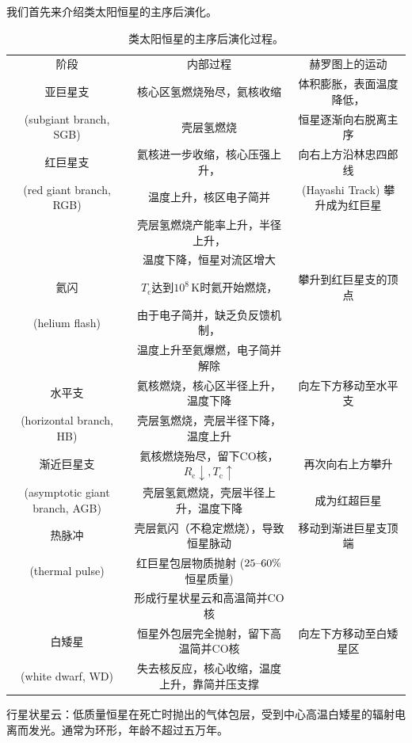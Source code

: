 \documentclass[../天体物理基础.tex]{subfiles}
\begin{document}
我们首先来介绍类太阳恒星的主序后演化。
\begin{table}[!htbp]
\centering
\caption{类太阳恒星的主序后演化过程。}
\begin{tabular}{c c c}
\hline
阶段 & 内部过程 & 赫罗图上的运动\\
\cline{1-3}
亚巨星支 & 核心区氢燃烧殆尽，氦核收缩 & 体积膨胀，表面温度降低，\\
(subgiant branch, SGB) & 壳层氢燃烧 & 恒星逐渐向右脱离主序\\
\cline{1-3}
红巨星支 & 氦核进一步收缩，核心压强上升， & 向右上方沿林忠四郎线\\
(red giant branch, RGB) & 温度上升，核区电子简并 & (Hayashi Track) 攀升成为红巨星\\
 & 壳层氢燃烧产能率上升，半径上升， & \\
 & 温度下降，恒星对流区增大 & \\
\cline{1-3}
氦闪 & $T_{\text{c}}$达到$10^{8}\,\mathrm{K}$时氦开始燃烧，& 攀升到红巨星支的顶点\\
(helium flash) & 由于电子简并，缺乏负反馈机制， & \\
 & 温度上升至氦爆燃，电子简并解除 & \\
\cline{1-3}
水平支 & 氦核燃烧，核心区半径上升，温度下降 & 向左下方移动至水平支\\
(horizontal branch, HB) & 壳层氢燃烧，壳层半径下降，温度上升 & \\
\cline{1-3}
渐近巨星支 & 氦核燃烧殆尽，留下$\mathrm{CO}$核，$R_{\text{c}}\downarrow,T_{\text{c}}\uparrow$ & 再次向右上方攀升\\
(asymptotic giant branch, AGB) & 壳层氢氦燃烧，壳层半径上升，温度下降 & 成为红超巨星\\
\cline{1-3}
热脉冲 & 壳层氦闪（不稳定燃烧），导致恒星脉动 & 移动到渐进巨星支顶端\\
(thermal pulse) & 红巨星包层物质抛射 ($25\text{\textendash}60\%$恒星质量) & \\
 & 形成行星状星云和高温简并$\mathrm{CO}$核 & \\
\cline{1-3}
白矮星 & 恒星外包层完全抛射，留下高温简并$\mathrm{CO}$核 & 向左下方移动至白矮星区\\
(white dwarf, WD) & 失去核反应，核心收缩，温度上升，靠简并压支撑 & \\
\hline
\end{tabular}
\label{}
\end{table}

行星状星云：低质量恒星在死亡时抛出的气体包层，受到中心高温白矮星的辐射电离而发光。通常为环形，年龄不超过五万年。
\end{document}
